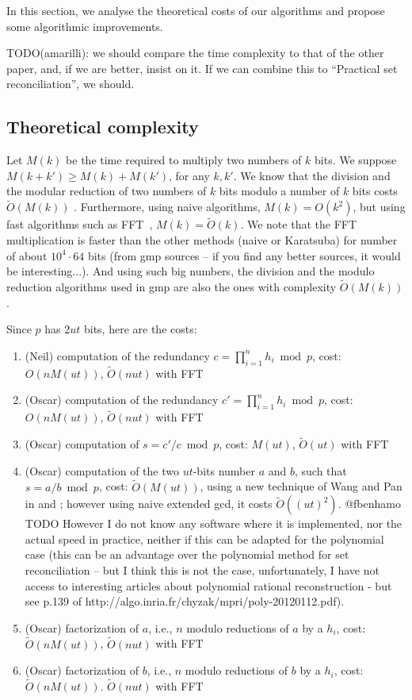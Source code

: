 \documentclass[11pt]{llncs}
\newcommand{\Oapp}{\ensuremath{\tilde{O}}}
\begin{document}
In this section, we analyse the theoretical costs of our algorithms and propose some algorithmic improvements.

TODO(amarilli): we should compare the time complexity to that of the other
paper, and, if we are better, insist on it. If we can combine this to
``Practical set reconciliation'', we should.

\subsection{Theoretical complexity}

Let $M(k)$ be the time required to multiply two numbers of $k$ bits.
We suppose $M(k+k') \ge M(k) + M(k')$, for any $k,k'$.
We know that the division and the modular reduction of two numbers of $k$ bits modulo a number of $k$ bits costs $\Oapp(M(k))$ \cite{burnikel1998fast}.
Furthermore, using naive algorithms, $M(k) = O(k^2)$, but using fast algorithms such as FFT~\cite{schonhage1971schnelle}, $M(k) = \Oapp(k)$.
We note that the FFT multiplication is faster than the other methods (naive or Karatsuba) for number of about $10^4 \cdot 64$ bits (from gmp sources -- if you find any better sources, it would be interesting...).
And using such big numbers, the division and the modulo reduction algorithms used in gmp are also the ones with complexity $\Oapp(M(k))$.

Since $p$ has $2 u t$ bits, here are the costs:
\begin{enumerate}
\item (Neil) computation of the redundancy $c=\prod_{i=1}^n h_i \bmod p$, cost: $O(n M(u t))$, $\Oapp(n u t)$ with FFT
\item (Oscar) computation of the redundancy $c'=\prod_{i=1}^n h_i \bmod p$, cost: $O(n M(u t))$, $\Oapp(n u t)$ with FFT
\item (Oscar) computation of $s = c' / c \bmod p$, cost: $M(u t)$, $\Oapp(u t)$ with FFT
\item (Oscar) computation of the two $u t$-bits number $a$ and $b$, such that $s = a / b \bmod p$, cost: $\Oapp(M(u t))$, using a new technique of Wang and Pan in \cite{pan2004rational} and \cite{wang2003acceleration}; however using naive extended gcd, it costs $\Oapp((u t)^2)$.
@fbenhamo TODO However I do not know any software where it is implemented, nor the actual speed in practice, neither if this can be adapted for the polynomial case (this can be an advantage over the polynomial method for set reconciliation -- but I think this is not the case, unfortunately, I have not access to interesting articles about polynomial rational reconstruction - but see p.139 of http://algo.inria.fr/chyzak/mpri/poly-20120112.pdf).
\item (Oscar) factorization of $a$, i.e., $n$ modulo reductions of $a$ by a $h_i$, cost: $\Oapp(n M(u t))$, $\Oapp(n u t)$ with FFT
\item (Oscar) factorization of $b$, i.e., $n$ modulo reductions of $b$ by a $h_i$, cost: $\Oapp(n M(u t))$. $\Oapp(n u t)$ with FFT
\end{enumerate}
\end{document}
